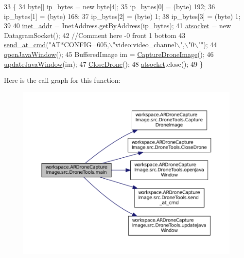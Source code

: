 \begin{DoxyCode}
33                                                             \{
34         byte[] ip\_bytes = \textcolor{keyword}{new} byte[4];
35         ip\_bytes[0] = (byte) 192;
36         ip\_bytes[1] = (byte) 168;
37         ip\_bytes[2] = (byte) 1;
38         ip\_bytes[3] = (byte) 1;
39 
40         \hyperlink{classworkspace_1_1_a_r_drone_capture_image_1_1src_1_1_drone_tools_a537370a44b88d1ed55ee857b7dbf97e1}{inet\_addr} = InetAddress.getByAddress(ip\_bytes);
41         \hyperlink{classworkspace_1_1_a_r_drone_capture_image_1_1src_1_1_drone_tools_ac0909587a6eff1f1c97c702d25c95e78}{atsocket} = \textcolor{keyword}{new} DatagramSocket();
42         \textcolor{comment}{//Comment here -0 front 1 bottom}
43         \hyperlink{classworkspace_1_1_a_r_drone_capture_image_1_1src_1_1_drone_tools_ae515c96a2274175cf7b5bda1893aa16f}{send\_at\_cmd}(\textcolor{stringliteral}{"AT*CONFIG=605,\(\backslash\)"video:video\_channel\(\backslash\)",\(\backslash\)"0\(\backslash\)""});
44         \hyperlink{classworkspace_1_1_a_r_drone_capture_image_1_1src_1_1_drone_tools_a3e245a974db9962604d25269975692e2}{openJavaWindow}();
45         BufferedImage im = \hyperlink{classworkspace_1_1_a_r_drone_capture_image_1_1src_1_1_drone_tools_a095e49b01ac341b6a4e7b139617ae20e}{CaptureDroneImage}();
46         \hyperlink{classworkspace_1_1_a_r_drone_capture_image_1_1src_1_1_drone_tools_a7bb40703a428b63ed0f23b9a22b72d36}{updateJavaWindow}(im);
47         \hyperlink{classworkspace_1_1_a_r_drone_capture_image_1_1src_1_1_drone_tools_a11c422d53a80fe301d792bcc857e4aef}{CloseDrone}();
48         \hyperlink{classworkspace_1_1_a_r_drone_capture_image_1_1src_1_1_drone_tools_ac0909587a6eff1f1c97c702d25c95e78}{atsocket}.close();
49     \}
\end{DoxyCode}


Here is the call graph for this function\+:\nopagebreak
\begin{figure}[H]
\begin{center}
\leavevmode
\includegraphics[width=350pt]{classworkspace_1_1_a_r_drone_capture_image_1_1src_1_1_drone_tools_a92aeefa5f533e5d4e55cd5ac86664f02_cgraph}
\end{center}
\end{figure}


